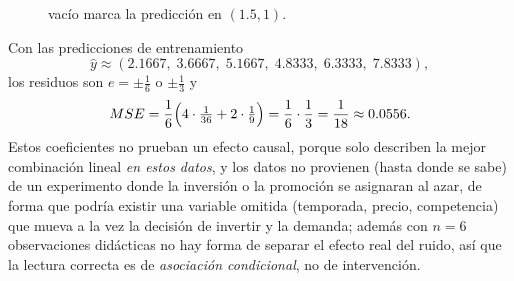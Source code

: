 \begin{enumerate}
\begin{figure}[H]
{vacío marca la predicción en $(1.5,1)$.}
\label{fig:ej2-rectas}
\end{figure} Con las predicciones de
entrenamiento
\[
    \hat y\approx(2.1667,\;3.6667,\;5.1667,\;4.8333,\;6.3333,\;7.8333),
\]
los residuos son $e=\pm\tfrac16$ o $\pm\tfrac13$ y
\[
    MSE = \frac{1}{6}\Bigl(4\cdot\tfrac{1}{36} + 2\cdot\tfrac{1}{9}\Bigr)
    = \frac{1}{6}\cdot\frac{1}{3} = \frac{1}{18} \approx 0.0556 .
\]
Estos coeficientes no prueban un efecto causal, porque solo describen
la mejor combinación lineal \emph{en estos datos}, y los datos no
provienen (hasta donde se sabe) de un experimento donde la inversión o
la promoción se asignaran al azar, de forma que podría existir una
variable omitida (temporada, precio, competencia) que mueva a la vez la
decisión de invertir y la demanda; además con $n=6$ observaciones
didácticas no hay forma de separar el efecto real del ruido, así que la
lectura correcta es de \emph{asociación condicional}, no de
intervención.


\end{enumerate}
